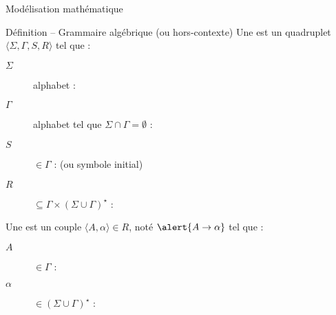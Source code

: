 
\begingroup
\begin{frame}{Modélisation mathématique}
  \begin{block}{Définition -- Grammaire algébrique (ou hors-contexte)}
    \vspace{2mm}
    Une  est un quadruplet \alert{$\langle \Sigma, \Gamma, S, R \rangle$} tel que :
    \begin{description}
    \item[\alert{$\Sigma$}] alphabet : 
    \item[\alert{$\Gamma$}] alphabet tel que $\Sigma \cap \Gamma = \emptyset$ : 
    \item[\alert{$S$}] $\in \Gamma$ :  (ou symbole initial)
    \item[\alert{$R$}] $\subseteq \Gamma \times (\Sigma \cup \Gamma)^\star$ : 
    \end{description}

    \vspace{3mm}
    Une  est un couple \alert{$\langle A, \alpha \rangle \in R$}, noté $\alert{A \rightarrow \alpha}$ tel que :
    \begin{description}
    \item[\alert{$A$}] $\in \Gamma$ : 
    \item[\alert{$\alpha$}] $\in (\Sigma \cup \Gamma)^\star$ : 
    \end{description}
  \end{block}

\end{frame}

\endgroup
